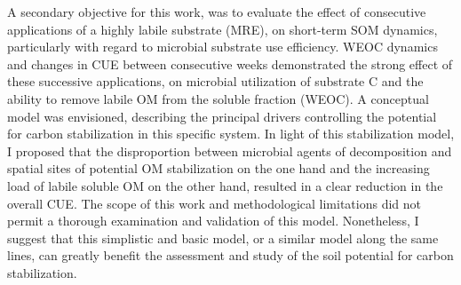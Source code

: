 A secondary objective for this work, was to evaluate the effect of consecutive applications of a highly labile substrate (MRE), on short-term SOM dynamics, particularly with regard to microbial substrate use efficiency. WEOC dynamics and changes in CUE between consecutive weeks demonstrated the strong effect of these successive applications, on microbial utilization of substrate C and the ability to remove labile OM from the soluble fraction (WEOC). A conceptual model was envisioned, describing the principal drivers controlling the potential for carbon stabilization in this specific system. In light of this stabilization model, I proposed that the disproportion between microbial agents of decomposition and spatial sites of potential OM stabilization on the one hand and the increasing load of labile soluble OM on the other hand, resulted in a clear reduction in the overall CUE.
The scope of this work and methodological limitations did not permit a thorough examination and validation of this model. Nonetheless, I suggest that this simplistic and basic model, or a similar model along the same lines, can greatly benefit the assessment and study of the soil potential for carbon stabilization.     	 
